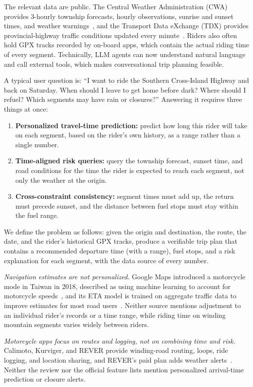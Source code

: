 The relevant data are public. The Central Weather Administration (CWA) provides 3-hourly township forecasts, hourly observations, sunrise and sunset times, and weather warnings~\cite{cwa2026opendata}, and the Transport Data eXchange (TDX) provides provincial-highway traffic conditions updated every minute~\cite{tdx2026traffic}. Riders also often hold GPX tracks recorded by on-board apps, which contain the actual riding time of every segment. Technically, LLM agents can now understand natural language and call external tools, which makes conversational trip planning feasible.

A typical user question is: ``I want to ride the Southern Cross-Island Highway and back on Saturday. When should I leave to get home before dark? Where should I refuel? Which segments may have rain or closures?'' Answering it requires three things at once:
\begin{enumerate}
  \item \textbf{Personalized travel-time prediction:} predict how long this rider will take on each segment, based on the rider's own history, as a range rather than a single number.
  \item \textbf{Time-aligned risk queries:} query the township forecast, sunset time, and road conditions for the time the rider is expected to reach each segment, not only the weather at the origin.
  \item \textbf{Cross-constraint consistency:} segment times must add up, the return must precede sunset, and the distance between fuel stops must stay within the fuel range.
\end{enumerate}
We define the problem as follows: given the origin and destination, the route, the date, and the rider's historical GPX tracks, produce a verifiable trip plan that contains a recommended departure time (with a range), fuel stops, and a risk explanation for each segment, with the data source of every number.

\textit{Navigation estimates are not personalized.} Google Maps introduced a motorcycle mode in Taiwan in 2018, described as using machine learning to account for motorcycle speeds~\cite{google2018scooter}, and its ETA model is trained on aggregate traffic data to improve estimates for most road users~\cite{derrow2021eta}. Neither source mentions adjustment to an individual rider's records or a time range, while riding time on winding mountain segments varies widely between riders.

\textit{Motorcycle apps focus on routes and logging, not on combining time and risk.} Calimoto, Kurviger, and REVER provide winding-road routing, loops, ride logging, and location sharing, and REVER's paid plan adds weather alerts~\cite{henges2025apps,rever2026pro}. Neither the review nor the official feature lists mention personalized arrival-time prediction or closure alerts.

